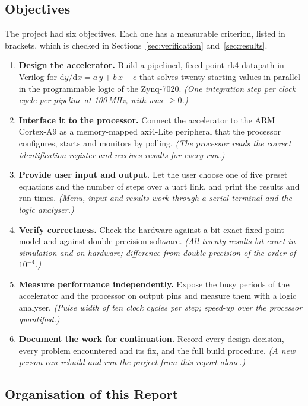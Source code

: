 \subsection{Objectives}
The project had six objectives. Each one has a measurable criterion, listed in brackets, which is
checked in Sections~\ref{sec:verification} and~\ref{sec:results}.
\begin{enumerate}[label=\textbf{O\arabic*.},leftmargin=3em]
  \item \textbf{Design the accelerator.} Build a pipelined, fixed-point \gls{rk4} datapath in Verilog
        for $\mathrm{d}y/\mathrm{d}x = a\,y + b\,x + c$ that solves twenty starting values in parallel
        in the programmable logic of the Zynq-7020.
        \emph{(One integration step per clock cycle per pipeline at 100\,MHz, with \gls{wns}~$\geq 0$.)}
  \item \textbf{Interface it to the processor.} Connect the accelerator to the ARM Cortex-A9 as a
        memory-mapped \gls{axi}4-Lite peripheral that the processor configures, starts and
        monitors by \gls{polling}.
        \emph{(The processor reads the correct identification register and receives results for every run.)}
  \item \textbf{Provide user input and output.} Let the user choose one of five preset equations
        and the number of steps over a \gls{uart} link, and print the results and run times.
        \emph{(Menu, input and results work through a serial terminal and the logic analyser.)}
  \item \textbf{Verify correctness.} Check the hardware against a bit-exact fixed-point model and
        against double-precision software.
        \emph{(All twenty results bit-exact in simulation and on hardware; difference from
        double precision of the order of $10^{-4}$.)}
  \item \textbf{Measure performance independently.} Expose the busy periods of the accelerator and
        the processor on output pins and measure them with a logic analyser.
        \emph{(Pulse width of ten clock cycles per step; speed-up over the processor quantified.)}
  \item \textbf{Document the work for continuation.} Record every design decision, every problem
        encountered and its fix, and the full build procedure.
        \emph{(A new person can rebuild and run the project from this report alone.)}
\end{enumerate}

\subsection{Organisation of this Report}

